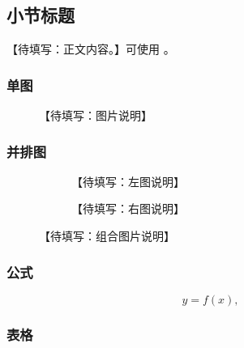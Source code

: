 
\subsection{小节标题}\label{sec:unique-section-id}


【待填写：正文内容。】可使用 。

\subsubsection{单图}

\begin{figure}[H]
  \centering
  \imageplaceholder{4cm}
  \caption{【待填写：图片说明】}
  \label{fig:unique-single-id}
\end{figure}

\subsubsection{并排图}

\begin{figure}[H]
  \centering
  \begin{subfigure}{0.48\linewidth}
    \centering
    \imageplaceholder[0.88\linewidth]{3cm}
    \caption{【待填写：左图说明】}
  \end{subfigure}\hfill
  \begin{subfigure}{0.48\linewidth}
    \centering
    \imageplaceholder[0.88\linewidth]{3cm}
    \caption{【待填写：右图说明】}
  \end{subfigure}
  \caption{【待填写：组合图片说明】}
  \label{fig:unique-group-id}
\end{figure}

\subsubsection{公式}

\begin{equation}
  y = f(x),
  \label{eq:unique-equation-id}
\end{equation}

\subsubsection{表格}

